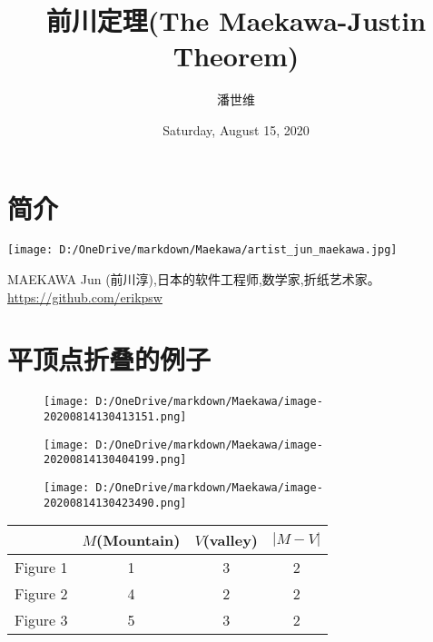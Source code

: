 \documentclass[a4paper,12pt]{article}
\begin{document}
\title {前川定理(The Maekawa-Justin Theorem)}
\author{潘世维}
\date{Saturday, August 15, 2020}
\maketitle
\section{简介} 
\begin{center}
    \texttt{[image: D:/OneDrive/markdown/Maekawa/artist\_jun\_maekawa.jpg]}
\end{center}


MAEKAWA Jun (前川淳),日本的软件工程师,数学家,折纸艺术家。
\url{https://github.com/erikpsw}
\section{平顶点折叠的例子}  
\begin{flushright}
\begin{figure}[h]
    \centering 
    \begin{minipage}{0.4\linewidth}
    \centering    %
    \texttt{[image: D:/OneDrive/markdown/Maekawa/image-20200814130413151.png]}	 
    \caption{}
    \end{minipage}
    \hfill
    \begin{minipage}{0.4\linewidth}
    \centering    %
    \texttt{[image: D:/OneDrive/markdown/Maekawa/image-20200814130404199.png]}
    \caption{}
    \end{minipage}
    \texttt{[image: D:/OneDrive/markdown/Maekawa/image-20200814130423490.png]}
    \caption{}
\end{figure}
\end{flushright}

\begin{table}[!htbp]
    \centering
    \begin{tabular}{|l|c|l|l|c|l|c|}
    \hline
     & \multicolumn{3}{c|}{$M$(Mountain)} & \multicolumn{2}{c|}{$V$(valley)} & \multicolumn{1}{l|}{$|M-V|$} \\ \hline
    Figure 1 & \multicolumn{3}{c|}{1} & \multicolumn{2}{c|}{3} & {\color[HTML]{9A0000} 2} \\ \hline
    Figure 2 & \multicolumn{3}{c|}{4} & \multicolumn{2}{c|}{2} & {\color[HTML]{9A0000} 2} \\ \hline
    Figure 3 & \multicolumn{3}{c|}{5} & \multicolumn{2}{c|}{3} & {\color[HTML]{9A0000} 2} \\ \hline
    \end{tabular}
\end{table}
      
\end{document}
